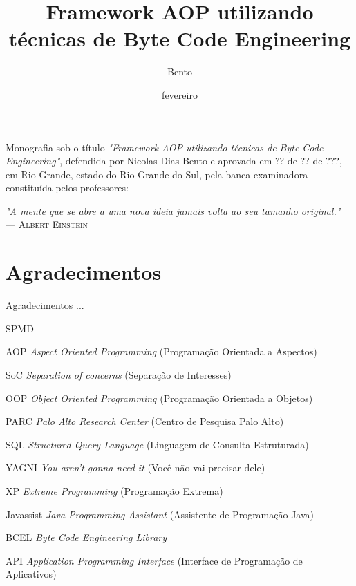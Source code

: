 \documentclass[tc,openright]{iiufrgs}
\title{Framework AOP utilizando técnicas de Byte Code Engineering}
\author{Bento}{Nicolas}
\date{fevereiro}{2014}
\begin{document}
\maketitle

\begin{folhadeaprovacao}
Monografia sob o título \textit{"Framework AOP utilizando técnicas de Byte Code Engineering"}, defendida por Nicolas Dias Bento e aprovada em ?? de ?? de ???, em Rio Grande, estado do Rio Grande do Sul, pela banca examinadora constituída pelos professores:
\end{folhadeaprovacao}

\clearpage

\begin{flushright}
\mbox{}\vfill
{\sffamily\itshape
"A mente que se abre a uma nova ideia jamais volta ao seu tamanho original."\\}
--- \textsc{Albert Einstein}
\end{flushright}

\chapter*{Agradecimentos}

Agradecimentos ...

\tableofcontents

\begin{listofabbrv}{SPMD}
	\item[AOP] \textit{Aspect Oriented Programming} (Programação Orientada a Aspectos)
	\item[SoC] \textit{Separation of concerns} (Separação de Interesses)
	\item[OOP] \textit{Object Oriented Programming} (Programação Orientada a Objetos)
	\item[PARC] \textit{Palo Alto Research Center} (Centro de Pesquisa Palo Alto) 
	\item[SQL] \textit{Structured Query Language} (Linguagem de Consulta Estruturada)
	\item[YAGNI] \textit{You aren’t gonna need it} (Você não vai precisar dele)
	\item[XP] \textit{Extreme Programming} (Programação Extrema)
	\item[Javassist] \textit{Java Programming Assistant} (Assistente de Programação Java)
	\item[BCEL] \textit{Byte Code Engineering Library}
	\item[API] \textit{Application Programming Interface} (Interface de Programação de Aplicativos)
\end{listofabbrv}
\end{document}
